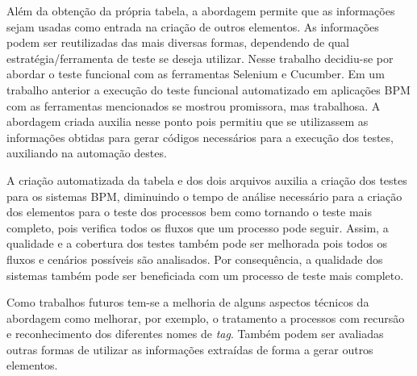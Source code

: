 \documentclass[12pt]{article}
\begin{document}
Além da obtenção da própria tabela, a abordagem permite que as informações sejam usadas como entrada na criação de outros elementos. As informações podem ser reutilizadas das mais diversas formas, dependendo de qual estratégia/ferramenta de teste se deseja utilizar. Nesse trabalho decidiu-se por abordar o teste funcional com as ferramentas Selenium e Cucumber. Em um trabalho anterior a execução do teste funcional automatizado em aplicações BPM com as ferramentas mencionados se mostrou promissora, mas trabalhosa. A abordagem criada auxilia nesse ponto pois permitiu que se utilizassem as informações obtidas para gerar códigos necessários para a execução dos testes, auxiliando na automação destes.

A criação automatizada da tabela e dos dois arquivos auxilia a criação dos testes para os sistemas BPM, diminuindo o tempo de análise necessário para a criação dos elementos para o teste dos processos bem como tornando o teste mais completo, pois verifica todos os fluxos que um processo pode seguir. Assim, a qualidade e a cobertura dos testes também pode ser melhorada pois todos os fluxos e cenários possíveis são analisados. Por consequência, a qualidade dos sistemas também pode ser beneficiada com um processo de teste mais completo.

Como trabalhos futuros tem-se a melhoria de alguns aspectos técnicos da abordagem como melhorar, por exemplo, o tratamento a processos com recursão e reconhecimento dos diferentes nomes de \emph{tag}. Também podem ser avaliadas outras formas de utilizar as informações extraídas de forma a gerar outros elementos.
 




\end{document}

